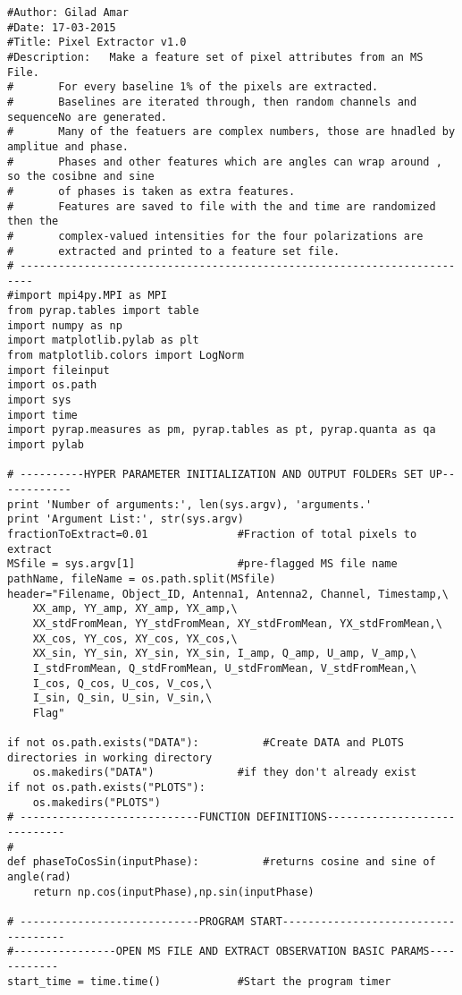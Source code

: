\begin{verbatim}
#Author: Gilad Amar
#Date: 17-03-2015
#Title: Pixel Extractor v1.0
#Description: 	Make a feature set of pixel attributes from an MS File. 
#		For every baseline 1% of the pixels are extracted.
#		Baselines are iterated through, then random channels and sequenceNo are generated.
#		Many of the featuers are complex numbers, those are hnadled by amplitue and phase.
#		Phases and other features which are angles can wrap around , so the cosibne and sine
#		of phases is taken as extra features.
#		Features are saved to file with the and time are randomized then the 
#		complex-valued intensities for the four polarizations are 
#		extracted and printed to a feature set file.
# ------------------------------------------------------------------------
#import mpi4py.MPI as MPI
from pyrap.tables import table
import numpy as np
import matplotlib.pylab as plt
from matplotlib.colors import LogNorm
import fileinput
import os.path
import sys
import time
import pyrap.measures as pm, pyrap.tables as pt, pyrap.quanta as qa
import pylab

# ----------HYPER PARAMETER INITIALIZATION AND OUTPUT FOLDERs SET UP------------
print 'Number of arguments:', len(sys.argv), 'arguments.'
print 'Argument List:', str(sys.argv)
fractionToExtract=0.01				#Fraction of total pixels to extract
MSfile = sys.argv[1]				#pre-flagged MS file name
pathName, fileName = os.path.split(MSfile)
header="Filename, Object_ID, Antenna1, Antenna2, Channel, Timestamp,\
	XX_amp, YY_amp, XY_amp, YX_amp,\
	XX_stdFromMean, YY_stdFromMean, XY_stdFromMean, YX_stdFromMean,\
	XX_cos, YY_cos, XY_cos, YX_cos,\
	XX_sin, YY_sin, XY_sin, YX_sin, I_amp, Q_amp, U_amp, V_amp,\
	I_stdFromMean, Q_stdFromMean, U_stdFromMean, V_stdFromMean,\
	I_cos, Q_cos, U_cos, V_cos,\
	I_sin, Q_sin, U_sin, V_sin,\
	Flag" 

if not os.path.exists("DATA"):			#Create DATA and PLOTS directories in working directory 	
    os.makedirs("DATA")				#if they don't already exist				
if not os.path.exists("PLOTS"):
    os.makedirs("PLOTS")
# ----------------------------FUNCTION DEFINITIONS-----------------------------
#
def phaseToCosSin(inputPhase):			#returns cosine and sine of angle(rad)
    return np.cos(inputPhase),np.sin(inputPhase)
  
# ----------------------------PROGRAM START------------------------------------
#----------------OPEN MS FILE AND EXTRACT OBSERVATION BASIC PARAMS------------
start_time = time.time()			#Start the program timer


\end{verbatim}
